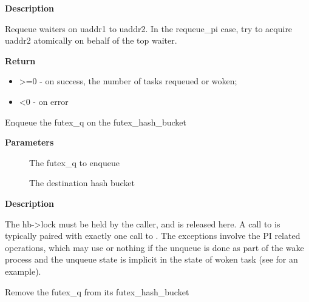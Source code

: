 \documentclass[a4paper,8pt,english]{sphinxmanual}
\begin{document}
\textbf{Description}

Requeue waiters on uaddr1 to uaddr2. In the requeue\_pi case, try to acquire
uaddr2 atomically on behalf of the top waiter.

\textbf{Return}
\begin{itemize}
\item {} 
\textgreater{}=0 - on success, the number of tasks requeued or woken;

\item {} 
\textless{}0 - on error

\end{itemize}

\begin{fulllineitems}
\label{kernel-hacking/locking:c.queue_me}
Enqueue the futex\_q on the futex\_hash\_bucket

\end{fulllineitems}


\textbf{Parameters}
\begin{description}
\item[{}] \leavevmode
The futex\_q to enqueue

\item[{}] \leavevmode
The destination hash bucket

\end{description}

\textbf{Description}

The hb-\textgreater{}lock must be held by the caller, and is released here. A call to
{\hyperref[kernel\string-hacking/locking:c.queue_me]{\emph{}}} is typically paired with exactly one call to {\hyperref[kernel\string-hacking/locking:c.unqueue_me]{\emph{}}}.  The
exceptions involve the PI related operations, which may use 
or nothing if the unqueue is done as part of the wake process and the unqueue
state is implicit in the state of woken task (see {\hyperref[kernel\string-hacking/locking:c.futex_wait_requeue_pi]{\emph{}}} for
an example).

\begin{fulllineitems}
\label{kernel-hacking/locking:c.unqueue_me}
Remove the futex\_q from its futex\_hash\_bucket

\end{fulllineitems}
\end{document}

